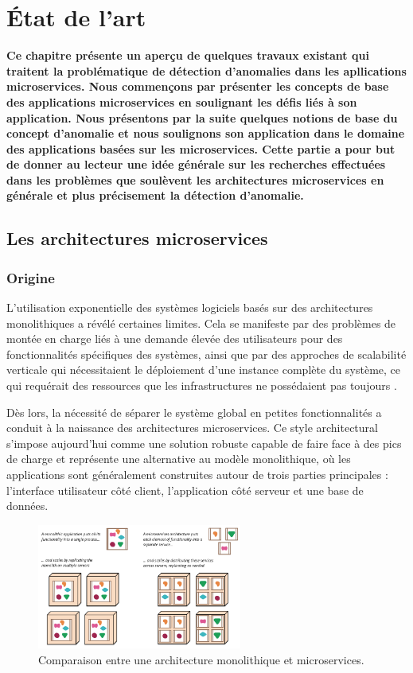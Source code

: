 \documentclass[a4paper,12pt]{report}
\begin{document}
\chapter{État de l’art}

\textbf{Ce chapitre présente un aperçu de quelques travaux existant qui traitent la problématique de détection d'anomalies dans les apllications microservices. Nous commençons par présenter les concepts de base des applications microservices en soulignant les défis liés à son application. Nous présentons par la suite quelques notions de base du concept d'anomalie et nous soulignons son application dans le domaine des applications basées sur les microservices. Cette partie a pour but de donner au lecteur une idée générale sur les recherches effectuées dans les problèmes que soulèvent les architectures microservices en générale et plus précisement la détection d'anomalie.} 

\section{Les architectures microservices}
\subsection{Origine}
L'utilisation exponentielle des systèmes logiciels basés sur des architectures monolithiques a révélé certaines limites. Cela se manifeste par des problèmes de montée en charge liés à une demande élevée des utilisateurs pour des fonctionnalités spécifiques des systèmes, ainsi que par des approches de scalabilité verticale qui nécessitaient le déploiement d'une instance complète du système, ce qui requérait des ressources que les infrastructures ne possédaient pas toujours \cite{mohamed_yousffi_archi}.

Dès lors, la nécessité de séparer le système global en petites fonctionnalités a conduit à la naissance des architectures microservices. Ce style architectural s'impose aujourd'hui comme une solution robuste capable de faire face à des pics de charge et représente une alternative au modèle monolithique, où les applications sont généralement construites autour de trois parties principales : l'interface utilisateur côté client, l'application côté serveur et une base de données.

\begin{figure}[H]
\centering
\includegraphics[width=0.6\textwidth]{images/microservices_vs_monolith.png}
\caption{Comparaison entre une architecture monolithique et microservices.}
\label{fig:archi}
\end{figure}
\end{document}
